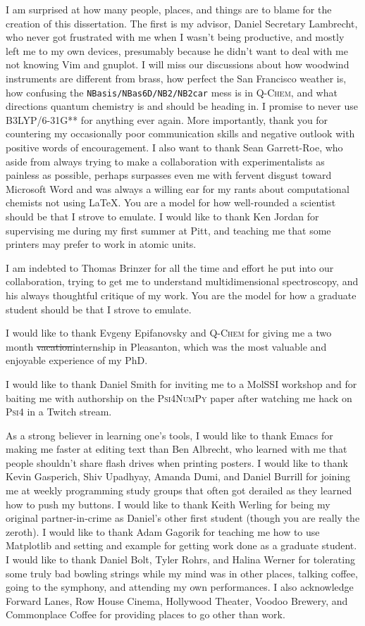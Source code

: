 \documentclass[%
  class = article,%
  crop = false,%
  float = true,%
  multi = true,%
  preview = false,%
]{standalone}
\begin{document}
I am surprised at how many people, places, and things are to blame for the creation of this dissertation. The first is my advisor, Daniel Secretary Lambrecht, who never got frustrated with me when I wasn't being productive, and mostly left me to my own devices, presumably because he didn't want to deal with me not knowing Vim and gnuplot. I will miss our discussions about how woodwind instruments are different from brass, how perfect the San Francisco weather is, how confusing the \texttt{NBasis/NBas6D/NB2/NB2car} mess is in \textsc{Q-Chem}, and what directions quantum chemistry is and should be heading in. I promise to never use B3LYP/6-31G** for anything ever again. More importantly, thank you for countering my occasionally poor communication skills and negative outlook with positive words of encouragement. I also want to thank Sean Garrett-Roe, who aside from always trying to make a collaboration with experimentalists as painless as possible, perhaps surpasses even me with fervent disgust toward Microsoft Word and was always a willing ear for my rants about computational chemists not using \LaTeX{}. You are a model for how well-rounded a scientist should be that I strove to emulate. I would like to thank Ken Jordan for supervising me during my first summer at Pitt, and teaching me that some printers may prefer to work in atomic units.

I am indebted to Thomas Brinzer for all the time and effort he put into our collaboration, trying to get me to understand multidimensional spectroscopy, and his always thoughtful critique of my work. You are the model for how a graduate student should be that I strove to emulate.

I would like to thank Evgeny Epifanovsky and \textsc{Q-Chem} for giving me a two month \st{vacation}internship in Pleasanton, which was the most valuable and enjoyable experience of my PhD.

I would like to thank Daniel Smith for inviting me to a MolSSI workshop and for baiting me with authorship on the \textsc{Psi4NumPy} paper after watching me hack on \textsc{Psi4} in a Twitch stream.

As a strong believer in learning one's tools, I would like to thank Emacs for making me faster at editing text than Ben Albrecht, who learned with me that people shouldn't share flash drives when printing posters. I would like to thank Kevin Gasperich, Shiv Upadhyay, Amanda Dumi, and Daniel Burrill for joining me at weekly programming study groups that often got derailed as they learned how to push my buttons. I would like to thank Keith Werling for being my original partner-in-crime as Daniel's other first student (though you are really the zeroth). I would like to thank Adam Gagorik for teaching me how to use Matplotlib and setting and example for getting work done as a graduate student. I would like to thank Daniel Bolt, Tyler Rohrs, and Halina Werner for tolerating some truly bad bowling strings while my mind was in other places, talking coffee, going to the symphony, and attending my own performances. I also acknowledge Forward Lanes, Row House Cinema, Hollywood Theater, Voodoo Brewery, and Commonplace Coffee for providing places to go other than work.
\end{document}
